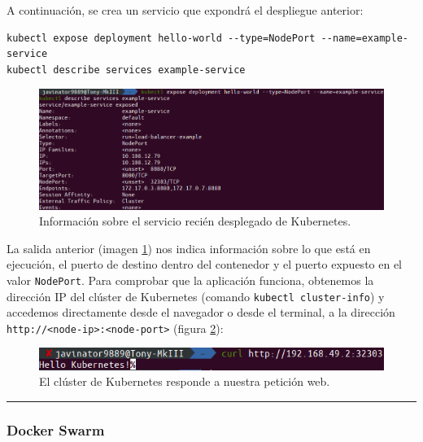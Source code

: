 A continuación, se crea un servicio que expondrá el despliegue anterior:

\begin{lstlisting}[style=bash, caption={}]
kubectl expose deployment hello-world --type=NodePort --name=example-service
kubectl describe services example-service
\end{lstlisting}

\begin{figure}[H]
    \centering
    \includegraphics[width=.9\linewidth]{pictures/k8s-service.png}
    \caption{Información sobre el servicio recién desplegado de Kubernetes.}
    \label{fig:k8s-service}
\end{figure}

La salida anterior (imagen \ref{fig:k8s-service}) nos indica información sobre
lo que está en ejecución, el puerto de destino dentro del contenedor y el
puerto expuesto en el valor \texttt{NodePort}. Para comprobar que la aplicación
funciona, obtenemos la dirección IP del clúster de Kubernetes (comando
\lstinline[style=bash]!kubectl cluster-info!) y accedemos directamente desde
el navegador o desde el terminal, a la dirección \texttt{http://<node-ip>:<node-port>}
(figura \ref{fig:hello-k8s}):

\begin{figure}[H]
    \centering
    \includegraphics[width=.5\linewidth]{pictures/hello-kubernetes.png}
    \caption{El clúster de Kubernetes responde a nuestra petición web.}
    \label{fig:hello-k8s}
\end{figure}

\noindent\rule{\linewidth}{.2pt}

\subsubsection*{Docker Swarm}
